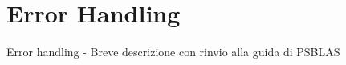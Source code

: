 \section{Error Handling}\label{sec:errors}

Error handling
    - Breve descrizione con rinvio alla guida di PSBLAS

